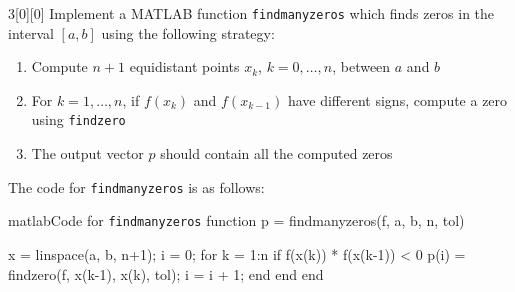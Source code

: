 \documentclass{article}
\begin{document}
\begin{hw}{3}[0][0]
	Implement a MATLAB function \texttt{findmanyzeros} which finds zeros in the interval $[a, b]$ using the following strategy:
	\begin{enumerate}
		\item Compute $n + 1$ equidistant points $x_k$, $k = 0, \ldots , n$, between $a$ and $b$
		\item For $k = 1, \ldots , n$, if $f (x_k)$ and $f (x_{k-1})$ have different signs, compute a zero using \texttt{findzero}
		\item The output vector $p$ should contain all the computed zeros
	\end{enumerate}
\end{hw}

\begin{solution}
The code for \texttt{findmanyzeros} is as follows:

\begin{code}{matlab}{Code for \texttt{findmanyzeros}}
function p = findmanyzeros(f, a, b, n, tol)

x = linspace(a, b, n+1);
i = 0;
for k = 1:n
	if f(x(k)) * f(x(k-1)) < 0
		p(i) = findzero(f, x(k-1), x(k), tol);
		i = i + 1;
	end
end
end
\end{code}
\end{solution}
\end{document}
